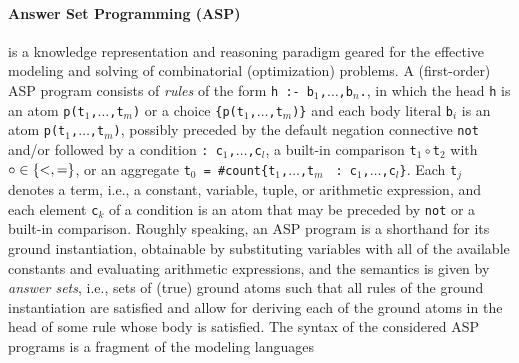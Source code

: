 \documentclass{tlp} %
\begin{document}
\paragraph{Answer Set Programming (ASP)} \citep{lifschitz19a}
is a knowledge representation and reasoning paradigm geared for the effective 
modeling and solving of combinatorial (optimization) problems. %
A (first-order) ASP program consists of \emph{rules} of the form
\lstinline{h :- b}$_1$\lstinline{,}$\dots$\lstinline{,b}$_n$\lstinline{.},
in which the head \lstinline{h} is an atom
\lstinline{p(t}$_1$\lstinline{,}$\dots$\lstinline{,t}$_m$\lstinline{)} or a
choice
\lstinline{{p(t}$_1$\lstinline{,}$\dots$\lstinline{,t}$_m$\lstinline|)}|
and each body literal \lstinline{b}$_i$ is an atom
\lstinline{p(t}$_1$\lstinline{,}$\dots$\lstinline{,t}$_m$\lstinline{)},
possibly preceded by the default negation connective \lstinline{not} and/or
followed by a condition
\lstinline|: c|$_1$\lstinline{,}$\dots$\lstinline{,c}$_l$, 
a built-in comparison \lstinline{t}$_1\circ{}$\lstinline{t}$_2$
with $\circ\in\{\text{\lstinline{<}},\text{\lstinline{=}}\}$,
or an aggregate
\lstinline|t|$_0$\lstinline| = #count{t|$_1$\lstinline{,}$\dots$\lstinline{,t}$_m$%
\lstinline| : c|$_1$\lstinline{,}$\dots$\lstinline{,c}$_l$\lstinline|}|.
Each \lstinline|t|$_j$ denotes a term, i.e., a constant, variable, tuple,
or arithmetic expression, and each element \lstinline|c|$_k$ of a condition is
an atom that may be preceded by \lstinline{not} or a built-in comparison.
Roughly speaking, an ASP program is a shorthand for its ground instantiation,
obtainable by substituting variables with all of the available constants
and evaluating arithmetic expressions,
and the semantics is given by \emph{answer sets}, i.e.,
sets of (true) ground atoms such that all rules of the ground instantiation
are satisfied and allow for deriving each of the ground atoms in the head of
some rule whose body is satisfied.
The syntax of the considered ASP programs is a fragment of the modeling languages
\end{document}

